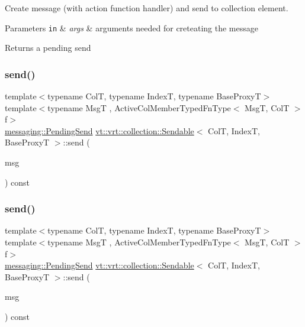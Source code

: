 Create message (with action function handler) and send to collection element. 


\begin{DoxyParams}[1]{Parameters}
\mbox{\tt in}  & {\em args} & arguments needed for creteating the message\\
\hline
\end{DoxyParams}
\begin{DoxyReturn}{Returns}
a pending send 
\end{DoxyReturn}
\mbox{\label{structvt_1_1vrt_1_1collection_1_1_sendable_a321d85ceafaf6525875fb7468a80ac6d}} 
\subsubsection{\texorpdfstring{send()}{send()}\hspace{0.1cm}{\footnotesize\ttfamily [4/7]}}
{\footnotesize\ttfamily template$<$typename ColT, typename IndexT, typename Base\+ProxyT$>$ \\
template$<$typename MsgT , Active\+Col\+Member\+Typed\+Fn\+Type$<$ Msg\+T, Col\+T $>$ f$>$ \\
\hyperlink{structvt_1_1messaging_1_1_pending_send}{messaging\+::\+Pending\+Send} \hyperlink{structvt_1_1vrt_1_1collection_1_1_sendable}{vt\+::vrt\+::collection\+::\+Sendable}$<$ ColT, IndexT, Base\+ProxyT $>$\+::send (\begin{DoxyParamCaption}\item[{MsgT $\ast$}]{msg }\end{DoxyParamCaption}) const}

\mbox{\label{structvt_1_1vrt_1_1collection_1_1_sendable_aa8c102820895d01422c14e8c0993fc90}} 
\subsubsection{\texorpdfstring{send()}{send()}\hspace{0.1cm}{\footnotesize\ttfamily [5/7]}}
{\footnotesize\ttfamily template$<$typename ColT, typename IndexT, typename Base\+ProxyT$>$ \\
template$<$typename MsgT , Active\+Col\+Member\+Typed\+Fn\+Type$<$ Msg\+T, Col\+T $>$ f$>$ \\
\hyperlink{structvt_1_1messaging_1_1_pending_send}{messaging\+::\+Pending\+Send} \hyperlink{structvt_1_1vrt_1_1collection_1_1_sendable}{vt\+::vrt\+::collection\+::\+Sendable}$<$ ColT, IndexT, Base\+ProxyT $>$\+::send (\begin{DoxyParamCaption}\item[{\hyperlink{namespacevt_ab2b3d506ec8e8d1540aede826d84a239}{Msg\+Shared\+Ptr}$<$ MsgT $>$}]{msg }\end{DoxyParamCaption}) const}

